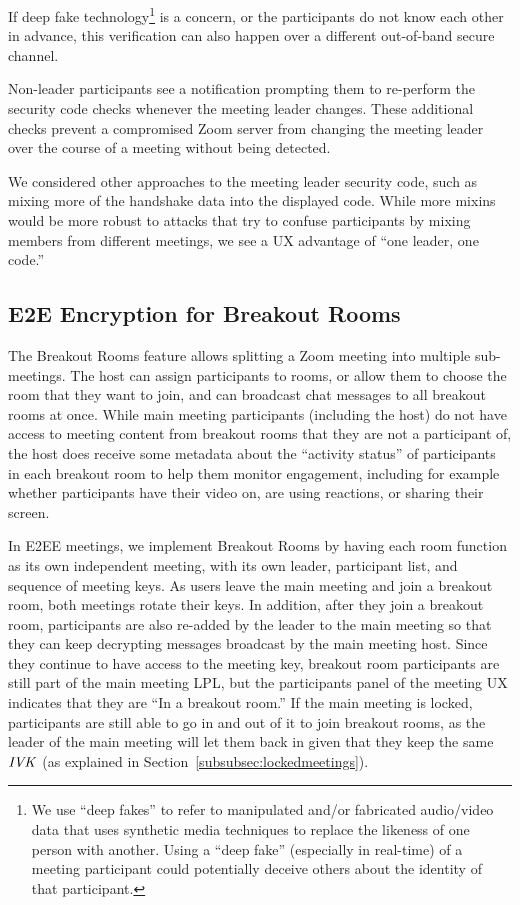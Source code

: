 If deep fake technology\footnote{We use ``deep fakes'' to refer to manipulated and/or fabricated
audio/video data that uses synthetic media techniques to replace the likeness of one person with
another. Using a ``deep fake'' (especially in real-time) of a meeting participant could potentially
deceive others about the identity of that participant.} is a concern, or the participants do not
know each other in advance, this verification can also happen over a different out-of-band secure
channel.

Non-leader participants see a notification prompting them to re-perform the security code checks
whenever the meeting leader changes. These additional checks prevent a compromised Zoom server from
changing the meeting leader over the course of a meeting without being detected.

We considered other approaches to the meeting leader security code, such as mixing more of the
handshake data into the displayed code. While more mixins would be more robust to attacks that try
to confuse participants by mixing members from different meetings, we see a UX advantage of ``one
leader, one code.''

\subsection{E2E Encryption for Breakout Rooms}
\label{subsec:bor}
The Breakout Rooms feature allows splitting a Zoom meeting into multiple sub-meetings. The host can
assign participants to rooms, or allow them to choose the room that they want to join, and can
broadcast chat messages to all breakout rooms at once. While main meeting participants (including
the host) do not have access to meeting content from breakout rooms that they are not a participant
of, the host does receive some metadata about the ``activity status'' of participants in each
breakout room to help them monitor engagement, including for example whether participants have their
video on, are using reactions, or sharing their screen.

In E2EE meetings, we implement Breakout Rooms by having each room function as its own independent
meeting, with its own leader, participant list, and sequence of meeting keys. As users leave the
main meeting and join a breakout room, both meetings rotate their keys. In addition, after they join
a breakout room, participants are also re-added by the leader to the main meeting so that they can
keep decrypting messages broadcast by the main meeting host. Since they continue to have access to
the meeting key, breakout room participants are still part of the main meeting LPL, but the
participants panel of the meeting UX indicates that they are ``In a breakout room.'' If the main
meeting is locked, participants are still able to go in and out of it to join breakout rooms, as the
leader of the main meeting will let them back in given that they keep the same $\mathit{IVK}$ (as explained
in Section~\ref{subsubsec:lockedmeetings}). 

